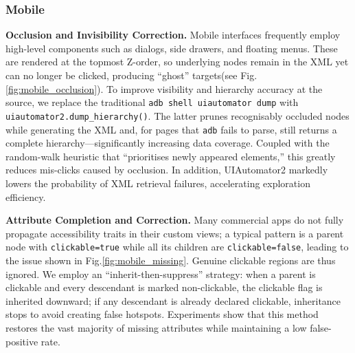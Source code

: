 \subsubsection{Mobile}
\textbf{Occlusion and Invisibility Correction.} 
Mobile interfaces frequently employ high-level components such as dialogs, side drawers, and floating menus. These are rendered at the topmost Z-order, so underlying nodes remain in the XML yet can no longer be clicked, producing ``ghost” targets(see Fig.\ref{fig:mobile_occlusion}). To improve visibility and hierarchy accuracy at the source, we replace the traditional \verb|adb shell uiautomator dump| with \verb|uiautomator2.dump_hierarchy()|. The latter prunes recognisably occluded nodes while generating the XML and, for pages that \texttt{adb} fails to parse, still returns a complete hierarchy—significantly increasing data coverage. Coupled with the random-walk heuristic that “prioritises newly appeared elements,” this greatly reduces mis-clicks caused by occlusion. In addition, UIAutomator2 markedly lowers the probability of XML retrieval failures, accelerating exploration efficiency.

\textbf{Attribute Completion and Correction.} 
Many commercial apps do not fully propagate accessibility traits in their custom views; a typical pattern is a parent node with \texttt{clickable=true} while all its children are \texttt{clickable=false}, leading to the issue shown in Fig.\ref{fig:mobile_missing}. Genuine clickable regions are thus ignored. We employ an “inherit-then-suppress” strategy: when a parent is clickable and every descendant is marked non-clickable, the clickable flag is inherited downward; if any descendant is already declared clickable, inheritance stops to avoid creating false hotspots. Experiments show that this method restores the vast majority of missing attributes while maintaining a low false-positive rate.

